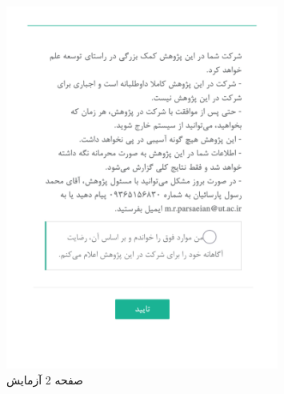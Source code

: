 \begin{figure}[htpb]
    \centering
    \includegraphics[width=0.8\textwidth]{./img/Task2.png}
    \caption{ صفحه 2 آزمایش }
    \label{fig:Task2}
\end{figure}


